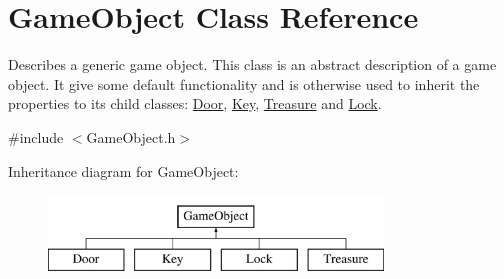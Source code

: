 \hypertarget{classGameObject}{\section{\-Game\-Object \-Class \-Reference}
\label{classGameObject}
}


\-Describes a generic game object. \-This class is an abstract description of a game object. \-It give some default functionality and is otherwise used to inherit the properties to its child classes\-: \hyperlink{classDoor}{\-Door}, \hyperlink{classKey}{\-Key}, \hyperlink{classTreasure}{\-Treasure} and \hyperlink{classLock}{\-Lock}.  




{\ttfamily \#include $<$\-Game\-Object.\-h$>$}

\-Inheritance diagram for \-Game\-Object\-:\begin{figure}[H]
\begin{center}
\leavevmode
\includegraphics[height=2.000000cm]{classGameObject}
\end{center}
\end{figure}
